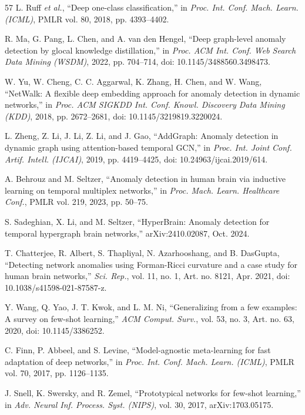 \begin{thebibliography}{57}
L. Ruff \emph{et al.}, ``Deep one-class classification,'' in \emph{Proc. Int. Conf. Mach. Learn. (ICML)}, PMLR vol. 80, 2018, pp. 4393--4402.

R. Ma, G. Pang, L. Chen, and A. van den Hengel, ``Deep graph-level anomaly detection by glocal knowledge distillation,'' in \emph{Proc. ACM Int. Conf. Web Search Data Mining (WSDM)}, 2022, pp. 704--714, doi: 10.1145/3488560.3498473.

W. Yu, W. Cheng, C. C. Aggarwal, K. Zhang, H. Chen, and W. Wang, ``NetWalk: A flexible deep embedding approach for anomaly detection in dynamic networks,'' in \emph{Proc. ACM SIGKDD Int. Conf. Knowl. Discovery Data Mining (KDD)}, 2018, pp. 2672--2681, doi: 10.1145/3219819.3220024.

L. Zheng, Z. Li, J. Li, Z. Li, and J. Gao, ``AddGraph: Anomaly detection in dynamic graph using attention-based temporal GCN,'' in \emph{Proc. Int. Joint Conf. Artif. Intell. (IJCAI)}, 2019, pp. 4419--4425, doi: 10.24963/ijcai.2019/614.

A. Behrouz and M. Seltzer, ``Anomaly detection in human brain via inductive learning on temporal multiplex networks,'' in \emph{Proc. Mach. Learn. Healthcare Conf.}, PMLR vol. 219, 2023, pp. 50--75.

S. Sadeghian, X. Li, and M. Seltzer, ``HyperBrain: Anomaly detection for temporal hypergraph brain networks,'' arXiv:2410.02087, Oct. 2024.

T. Chatterjee, R. Albert, S. Thapliyal, N. Azarhooshang, and B. DasGupta, ``Detecting network anomalies using Forman-Ricci curvature and a case study for human brain networks,'' \emph{Sci. Rep.}, vol. 11, no. 1, Art. no. 8121, Apr. 2021, doi: 10.1038/s41598-021-87587-z.

Y. Wang, Q. Yao, J. T. Kwok, and L. M. Ni, ``Generalizing from a few examples: A survey on few-shot learning,'' \emph{ACM Comput. Surv.}, vol. 53, no. 3, Art. no. 63, 2020, doi: 10.1145/3386252.

C. Finn, P. Abbeel, and S. Levine, ``Model-agnostic meta-learning for fast adaptation of deep networks,'' in \emph{Proc. Int. Conf. Mach. Learn. (ICML)}, PMLR vol. 70, 2017, pp. 1126--1135.

J. Snell, K. Swersky, and R. Zemel, ``Prototypical networks for few-shot learning,'' in \emph{Adv. Neural Inf. Process. Syst. (NIPS)}, vol. 30, 2017, arXiv:1703.05175.


\end{thebibliography}
